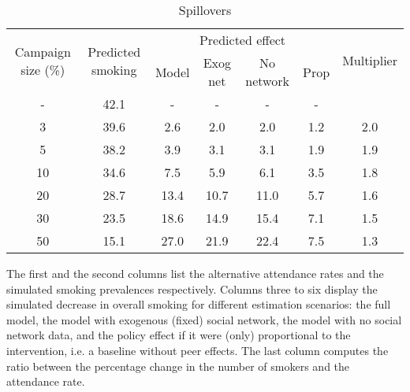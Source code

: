 
    \begin{table}[!h]
    \caption{Spillovers}
    \label{table:ctrf-spillovers}
    \begin{center}
    \begin{tabular}{ccccccc}
    \multirow{2}{2cm}{Campaign size (\%)}  
    & \multirow{2}{2cm}{Predicted smoking} 
    & \multicolumn{4}{c}{Predicted effect}
    & \multirow{2}{*}{Multiplier} \\
    & & Model
    & Exog net
    & No network
    & Prop    
    \\
     \hline \hline
    - & 42.1 & - & - & - & - & \\ 
   3& 39.6&  2.6&  2.0&  2.0&  1.2&  2.0 \\ 
   5& 38.2&  3.9&  3.1&  3.1&  1.9&  1.9 \\ 
  10& 34.6&  7.5&  5.9&  6.1&  3.5&  1.8 \\ 
  20& 28.7& 13.4& 10.7& 11.0&  5.7&  1.6 \\ 
  30& 23.5& 18.6& 14.9& 15.4&  7.1&  1.5 \\ 
  50& 15.1& 27.0& 21.9& 22.4&  7.5&  1.3 \\ 

    \hline
    \end{tabular}
    \end{center}
     The first and the second columns list the alternative attendance rates and the simulated smoking prevalences respectively.
    Columns three to six display the simulated decrease in overall smoking for different estimation scenarios:
        the full model, the model with exogenous (fixed) social network, the model with no social network data, and 
        the policy effect if it were (only) proportional to the intervention, i.e. a baseline without peer effects. 
        The last column computes the ratio between the percentage change in the number of smokers and the attendance rate.
    \end{table}
    